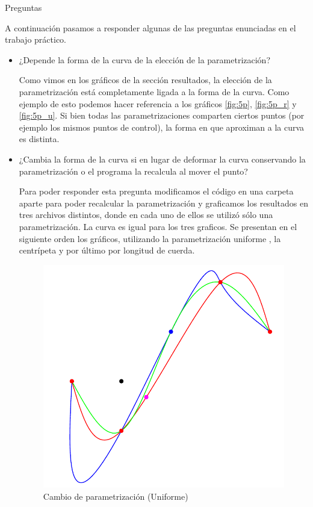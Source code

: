 \begin{section}{Preguntas}

A continuación pasamos a responder algunas de las preguntas enunciadas en el trabajo práctico.
\begin{itemize}
	\item ¿Depende la forma de la curva de la elección de la parametrización?
	
		Como vimos en los gráficos de la sección resultados, la elección de la parametrización está completamente ligada a la forma de la curva. Como ejemplo de esto podemos hacer referencia a los gráficos \ref{fig:5p}, \ref{fig:5p_r} y \ref{fig:5p_u}. Si bien todas las parametrizaciones comparten ciertos puntos (por ejemplo los mismos puntos de control), la forma en que aproximan a la curva es distinta.

	\item ¿Cambia la forma de la curva si en lugar de deformar la curva conservando la parametrización o el programa la recalcula al mover el punto?

	Para poder responder esta pregunta modificamos el código en una carpeta aparte para poder recalcular la parametrización y graficamos los resultados en tres archivos distintos, donde en cada uno de ellos se utilizó sólo una parametrización. La curva es igual para los tres graficos.
	Se presentan en el siguiente orden los gráficos, utilizando la parametrización uniforme , la centrípeta y por último por longitud de cuerda.
	
	\begin{figure}[H]
		  \centering
			\includegraphics[width=14cm]{graficos/paramVSreparamUniform.pdf}
		  \caption{Cambio de parametrización (Uniforme)}
		  \label{fig:paramChangeUniform}
	\end{figure}
	

\end{itemize}
\end{section}

